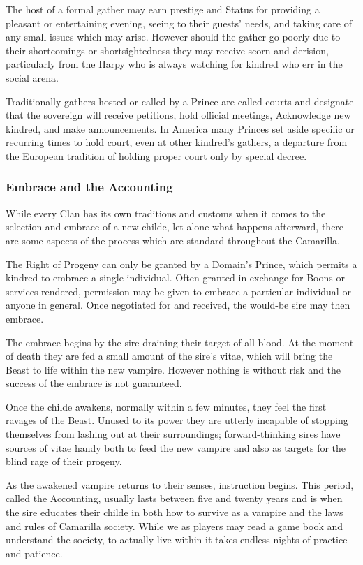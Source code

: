 The host of a formal gather may earn prestige and Status for providing a pleasant or 
entertaining evening, seeing to their guests' needs, and taking care of any small issues 
which may arise.  However should the gather go poorly due to their shortcomings or 
shortsightedness they may receive scorn and derision, particularly from the Harpy 
who is always watching for kindred who err in the social arena.

Traditionally gathers hosted or called by a Prince are called courts and designate
that the sovereign will receive petitions, hold official meetings, Acknowledge new 
kindred, and make announcements.  In America many Princes set aside specific or 
recurring times to hold court, even at other kindred's gathers, a departure from the 
European tradition of holding proper court only by special decree.

\subsubsection{Embrace and the Accounting}
While every Clan has its own traditions and customs when it comes to the selection and 
embrace of a new childe, let alone what happens afterward, there are some aspects of 
the process which are standard throughout the Camarilla.  

The Right of Progeny can only be granted by a Domain's Prince, which permits a kindred 
to embrace a single individual.  Often granted in exchange for Boons or services 
rendered, permission may be given to embrace a particular individual or anyone in 
general.  Once negotiated for and received, the would-be sire may then embrace.

The embrace begins by the sire draining their target of all blood.  At the moment of 
death they are fed a small amount of the sire's vitae, which will bring the Beast to 
life within the new vampire.  However nothing is without risk and the success of the 
embrace is not guaranteed.

Once the childe awakens, normally within a few minutes, they feel the first ravages 
of the Beast.  Unused to its power they are utterly incapable of stopping themselves 
from lashing out at their surroundings; forward-thinking sires have sources of vitae 
handy both to feed the new vampire and also as targets for the blind rage of their 
progeny.

As the awakened vampire returns to their senses, instruction begins.  This period, 
called the Accounting, usually lasts between five and twenty years and is when the 
sire educates their childe in both how to survive as a vampire and the laws and rules 
of Camarilla society.  While we as players may read a game book and understand the 
society, to actually live within it takes endless nights of practice and patience.

